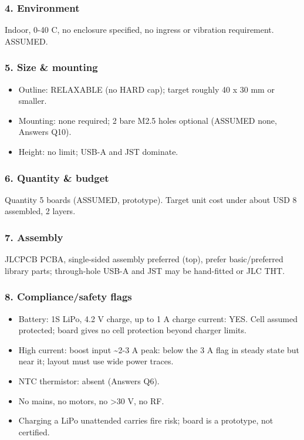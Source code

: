 \documentclass[11pt]{article}
\begin{document}
\subsubsection*{4. Environment}
Indoor, 0-40 C, no enclosure specified, no ingress or vibration requirement. ASSUMED.

\subsubsection*{5. Size \& mounting}
\begin{itemize}
\item Outline: RELAXABLE (no HARD cap); target roughly 40 x 30 mm or smaller.
\item Mounting: none required; 2 bare M2.5 holes optional (ASSUMED none, Answers Q10).
\item Height: no limit; USB-A and JST dominate.
\end{itemize}
\subsubsection*{6. Quantity \& budget}
Quantity 5 boards (ASSUMED, prototype). Target unit cost under about USD 8 assembled, 2 layers.

\subsubsection*{7. Assembly}
JLCPCB PCBA, single-sided assembly preferred (top), prefer basic/preferred library parts; through-hole USB-A and JST may be hand-fitted or JLC THT.

\subsubsection*{8. Compliance/safety flags}
\begin{itemize}
\item Battery: 1S LiPo, 4.2 V charge, up to 1 A charge current: YES. Cell assumed protected; board gives no cell protection beyond charger limits.
\item High current: boost input \textasciitilde{}2-3 A peak: below the 3 A flag in steady state but near it; layout must use wide power traces.
\item NTC thermistor: absent (Answers Q6).
\item No mains, no motors, no \textgreater{}30 V, no RF.
\item Charging a LiPo unattended carries fire risk; board is a prototype, not certified.
\end{itemize}
\end{document}
